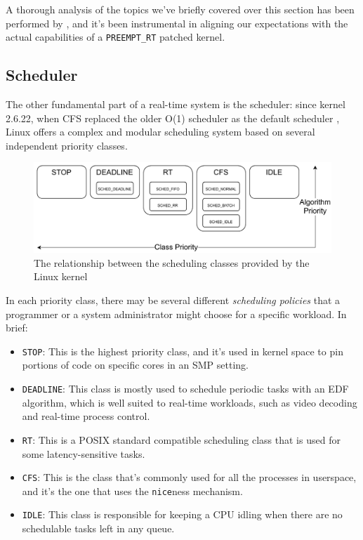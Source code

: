 \documentclass[a4paper,12pt]{report}
\begin{document}
A thorough analysis of the topics we've briefly covered over this section has been performed by \textcite{survey-preempt-rt}, and it's been instrumental in aligning our expectations with the actual capabilities of a \texttt{PREEMPT\_RT} patched kernel.

\subsection{Scheduler}

The other fundamental part of a real-time system is the scheduler: since kernel 2.6.22, when CFS replaced the older O(1) scheduler as the default scheduler \cite{lwn-cfs-merge}, Linux offers a complex and modular scheduling system based on several independent priority classes. 

\begin{figure}[H]
    \centering
    \includegraphics[width=\textwidth]{img/sched-class.pdf}
    \caption{The relationship between the scheduling classes provided by the Linux kernel}
\end{figure}

In each priority class, there may be several different \textit{scheduling policies} that a programmer or a system administrator might choose for a specific workload. In brief: 

\begin{itemize}
    \item \texttt{STOP}: This is the highest priority class, and it's used in kernel space to pin portions of code on specific cores in an SMP setting.
    \item \texttt{DEADLINE}: This class is mostly used to schedule periodic tasks with an EDF algorithm, which is well suited to real-time workloads, such as video decoding and real-time process control.
    \item \texttt{RT}: This is a POSIX standard compatible scheduling class that is used for some latency-sensitive tasks.
    \item \texttt{CFS}: This is the class that's commonly used for all the processes in userspace, and it's the one that uses the \texttt{nice}ness mechanism.
    \item \texttt{IDLE}: This class is responsible for keeping a CPU idling when there are no schedulable tasks left in any queue.
\end{itemize}
\end{document}
